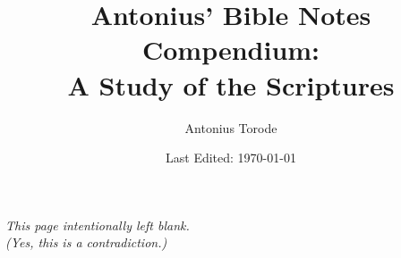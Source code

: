 \documentclass[openany,twoside, letterpaper,11pt]{book}
\title{Antonius' Bible Notes Compendium: \\ A Study of the Scriptures}
\author{Antonius Torode}
\date{Last Edited: \today}  %
\begin{document}
	
\maketitle
\thispagestyle{empty}
\pagestyle{empty}




\tableofcontents

\thispagestyle{empty}
\newpage
{}
\begin{center}
	\textit{This page intentionally left blank.\\ (Yes, this is a contradiction.)}
\end{center}
	
\newpage  %

%

\pagestyle{fancy} %


%
%
%
%





\backmatter

\printindex
\end{document}
